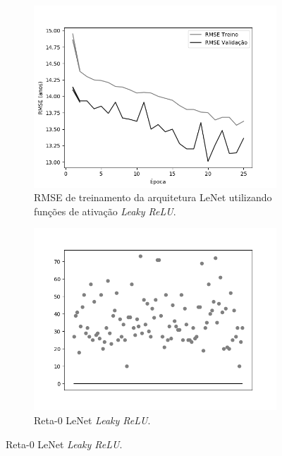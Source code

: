 \begin{figure}[h!]
\begin{subfigure}[hb]{0.5\linewidth}
		\end{subfigure}\\
		\begin{subfigure}[hb]{0.5\linewidth}
			\caption{RMSE de treinamento da arquitetura LeNet utilizando funções de ativação \emph{Leaky ReLU}.}
			\includegraphics[width=\linewidth]{img/graficos/history/lenet/fig-history-image-treat-2-lenet-lrelu-rmse.png}
		\end{subfigure}
		\begin{subfigure}[hb]{0.5\linewidth}
			\caption{Reta-0 LeNet \emph{Leaky ReLU}.}
		 \includegraphics[width=\linewidth]{img/graficos/reta0/lenet/fig-reta-0-image-treat-2-lenet-lrelu.png}
		\end{subfigure}%
	\end{figure}

